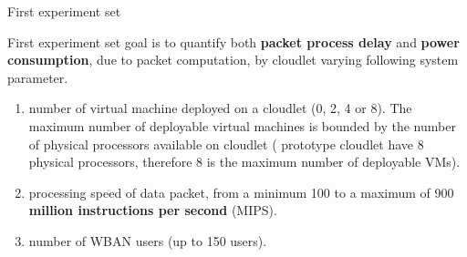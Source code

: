 \documentclass[10pt]{beamer}
\begin{document}
\begin{frame}{First experiment set}


First experiment set goal is to quantify both \textbf{packet process delay} and \textbf{power consumption}, due to packet computation, by cloudlet varying following system parameter.

\begin{enumerate}

\item number of virtual machine deployed on a cloudlet (0, 2, 4 or 8). The maximum number of deployable virtual machines is bounded by the number of physical processors available on cloudlet (\citet{MSAReport} prototype cloudlet have 8 physical processors, therefore 8 is the maximum number of deployable VMs).
 
\item processing speed of data packet, from a minimum 100 to a maximum of 900 \textbf{million instructions per second} (MIPS).

\item number of WBAN users (up to 150 users).

\end{enumerate}


\end{frame} 
\end{document}
